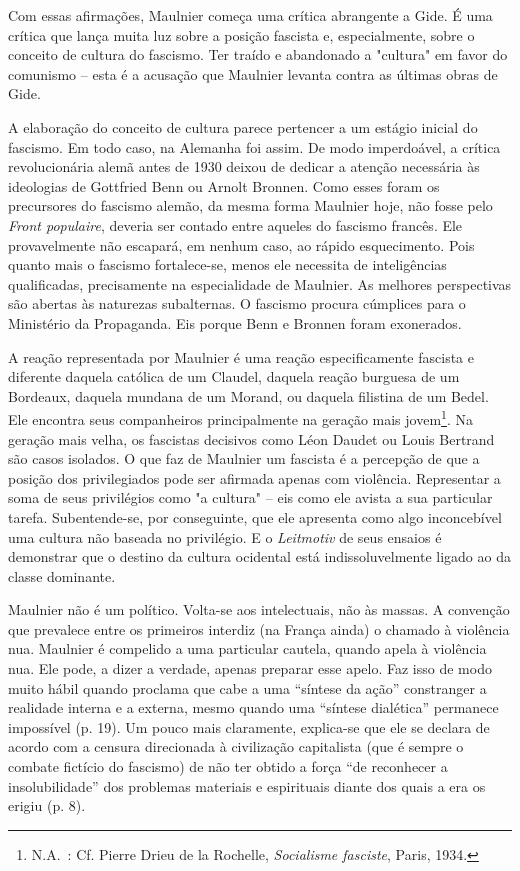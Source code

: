 Com essas afirmações, Maulnier começa uma crítica abrangente a Gide. É
uma crítica que lança muita luz sobre a posição fascista e,
especialmente, sobre o conceito de cultura do fascismo. Ter traído e
abandonado a "cultura" em favor do comunismo -- esta é a acusação que
Maulnier levanta contra as últimas obras de Gide.

A elaboração do conceito de cultura parece pertencer a um estágio
inicial do fascismo. Em todo caso, na Alemanha foi assim. De modo
imperdoável, a crítica revolucionária alemã antes de 1930 deixou de
dedicar a atenção necessária às ideologias de Gottfried Benn ou Arnolt
Bronnen. Como esses foram os precursores do fascismo alemão, da mesma
forma Maulnier hoje, não fosse pelo \emph{Front populaire}, deveria ser
contado entre aqueles do fascismo francês. Ele provavelmente não
escapará, em nenhum caso, ao rápido esquecimento. Pois quanto mais o
fascismo fortalece-se, menos ele necessita de inteligências
qualificadas, precisamente na especialidade de Maulnier. As melhores
perspectivas são abertas às naturezas subalternas. O fascismo procura
cúmplices para o Ministério da Propaganda. Eis porque Benn e Bronnen
foram exonerados.

A reação representada por Maulnier é uma reação especificamente fascista
e diferente daquela católica de um Claudel, daquela reação burguesa de
um Bordeaux, daquela mundana de um Morand, ou daquela filistina de um
Bedel. Ele encontra seus companheiros principalmente na geração mais
jovem\footnote{N.A.~: Cf. Pierre Drieu de la Rochelle, \emph{Socialisme
  fasciste}, Paris, 1934.}. Na geração mais velha, os fascistas
decisivos como Léon Daudet ou Louis Bertrand são casos isolados. O que
faz de Maulnier um fascista é a percepção de que a posição dos
privilegiados pode ser afirmada apenas com violência. Representar a soma
de seus privilégios como "a cultura" -- eis como ele avista a sua
particular tarefa. Subentende-se, por conseguinte, que ele apresenta
como algo inconcebível uma cultura não baseada no privilégio. E o
\emph{Leitmotiv} de seus ensaios é demonstrar que o destino da cultura
ocidental está indissoluvelmente ligado ao da classe dominante.

Maulnier não é um político. Volta-se aos intelectuais, não às massas. A
convenção que prevalece entre os primeiros interdiz (na França ainda) o
chamado à violência nua. Maulnier é compelido a uma particular cautela,
quando apela à violência nua. Ele pode, a dizer a verdade, apenas
preparar esse apelo. Faz isso de modo muito hábil quando proclama que
cabe a uma ``síntese da ação'' constranger a realidade interna e a
externa, mesmo quando uma ``síntese dialética'' permanece impossível (p.
19). Um pouco mais claramente, explica-se que ele se declara de acordo
com a censura direcionada à civilização capitalista (que é sempre o
combate fictício do fascismo) de não ter obtido a força ``de reconhecer
a insolubilidade'' dos problemas materiais e espirituais diante dos
quais a era os erigiu (p. 8).

